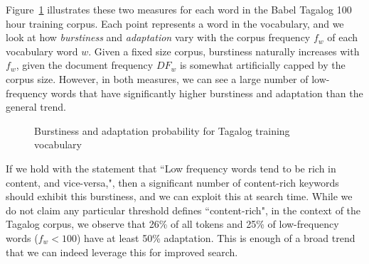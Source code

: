 Figure~\ref{fig:tagalogAdapt} illustrates these two measures for each word in the Babel Tagalog 100 hour training corpus.  Each point represents a word in the vocabulary, and we look at how \textit{burstiness} and \textit{adaptation} vary with the corpus frequency $f_w$ of each vocabulary word $w$.  Given a fixed size corpus, burstiness naturally increases with $f_w$, given the document frequency $DF_w$ is somewhat artificially capped by the corpus size.  However, in both measures, we can see a large number of low-frequency words that have significantly higher burstiness and adaptation than the general trend.  

\begin{figure}[t]
\caption[Burstiness and adaptation of Tagalog training vocabulary]{Burstiness and adaptation probability for Tagalog training vocabulary \label{fig:tagalogAdapt}}
\end{figure}

If we hold with the statement that ``Low frequency words tend to be rich in content, and vice-versa,"\cite{church1999}, then a significant number of content-rich keywords should exhibit this burstiness, and we can exploit this at search time.  While we do not claim any particular threshold defines ``content-rich", in the context of the Tagalog corpus, we observe that 26\% of all tokens and 25\% of low-frequency words ($f_w < 100$) have at least 50\% adaptation.  This is enough of a broad trend that we can indeed leverage this for improved search.

